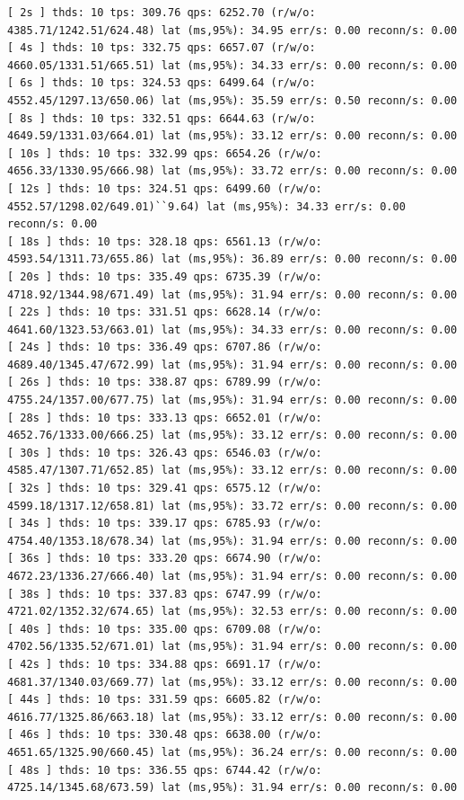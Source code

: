 \documentclass{article}
\begin{document}
\begin{verbatim}
[ 2s ] thds: 10 tps: 309.76 qps: 6252.70 (r/w/o: 4385.71/1242.51/624.48) lat (ms,95%): 34.95 err/s: 0.00 reconn/s: 0.00
[ 4s ] thds: 10 tps: 332.75 qps: 6657.07 (r/w/o: 4660.05/1331.51/665.51) lat (ms,95%): 34.33 err/s: 0.00 reconn/s: 0.00
[ 6s ] thds: 10 tps: 324.53 qps: 6499.64 (r/w/o: 4552.45/1297.13/650.06) lat (ms,95%): 35.59 err/s: 0.50 reconn/s: 0.00
[ 8s ] thds: 10 tps: 332.51 qps: 6644.63 (r/w/o: 4649.59/1331.03/664.01) lat (ms,95%): 33.12 err/s: 0.00 reconn/s: 0.00
[ 10s ] thds: 10 tps: 332.99 qps: 6654.26 (r/w/o: 4656.33/1330.95/666.98) lat (ms,95%): 33.72 err/s: 0.00 reconn/s: 0.00
[ 12s ] thds: 10 tps: 324.51 qps: 6499.60 (r/w/o: 4552.57/1298.02/649.01)``9.64) lat (ms,95%): 34.33 err/s: 0.00 reconn/s: 0.00
[ 18s ] thds: 10 tps: 328.18 qps: 6561.13 (r/w/o: 4593.54/1311.73/655.86) lat (ms,95%): 36.89 err/s: 0.00 reconn/s: 0.00
[ 20s ] thds: 10 tps: 335.49 qps: 6735.39 (r/w/o: 4718.92/1344.98/671.49) lat (ms,95%): 31.94 err/s: 0.00 reconn/s: 0.00
[ 22s ] thds: 10 tps: 331.51 qps: 6628.14 (r/w/o: 4641.60/1323.53/663.01) lat (ms,95%): 34.33 err/s: 0.00 reconn/s: 0.00
[ 24s ] thds: 10 tps: 336.49 qps: 6707.86 (r/w/o: 4689.40/1345.47/672.99) lat (ms,95%): 31.94 err/s: 0.00 reconn/s: 0.00
[ 26s ] thds: 10 tps: 338.87 qps: 6789.99 (r/w/o: 4755.24/1357.00/677.75) lat (ms,95%): 31.94 err/s: 0.00 reconn/s: 0.00
[ 28s ] thds: 10 tps: 333.13 qps: 6652.01 (r/w/o: 4652.76/1333.00/666.25) lat (ms,95%): 33.12 err/s: 0.00 reconn/s: 0.00
[ 30s ] thds: 10 tps: 326.43 qps: 6546.03 (r/w/o: 4585.47/1307.71/652.85) lat (ms,95%): 33.12 err/s: 0.00 reconn/s: 0.00
[ 32s ] thds: 10 tps: 329.41 qps: 6575.12 (r/w/o: 4599.18/1317.12/658.81) lat (ms,95%): 33.72 err/s: 0.00 reconn/s: 0.00
[ 34s ] thds: 10 tps: 339.17 qps: 6785.93 (r/w/o: 4754.40/1353.18/678.34) lat (ms,95%): 31.94 err/s: 0.00 reconn/s: 0.00
[ 36s ] thds: 10 tps: 333.20 qps: 6674.90 (r/w/o: 4672.23/1336.27/666.40) lat (ms,95%): 31.94 err/s: 0.00 reconn/s: 0.00
[ 38s ] thds: 10 tps: 337.83 qps: 6747.99 (r/w/o: 4721.02/1352.32/674.65) lat (ms,95%): 32.53 err/s: 0.00 reconn/s: 0.00
[ 40s ] thds: 10 tps: 335.00 qps: 6709.08 (r/w/o: 4702.56/1335.52/671.01) lat (ms,95%): 31.94 err/s: 0.00 reconn/s: 0.00
[ 42s ] thds: 10 tps: 334.88 qps: 6691.17 (r/w/o: 4681.37/1340.03/669.77) lat (ms,95%): 33.12 err/s: 0.00 reconn/s: 0.00
[ 44s ] thds: 10 tps: 331.59 qps: 6605.82 (r/w/o: 4616.77/1325.86/663.18) lat (ms,95%): 33.12 err/s: 0.00 reconn/s: 0.00
[ 46s ] thds: 10 tps: 330.48 qps: 6638.00 (r/w/o: 4651.65/1325.90/660.45) lat (ms,95%): 36.24 err/s: 0.00 reconn/s: 0.00
[ 48s ] thds: 10 tps: 336.55 qps: 6744.42 (r/w/o: 4725.14/1345.68/673.59) lat (ms,95%): 31.94 err/s: 0.00 reconn/s: 0.00

\end{verbatim}
\end{document}
